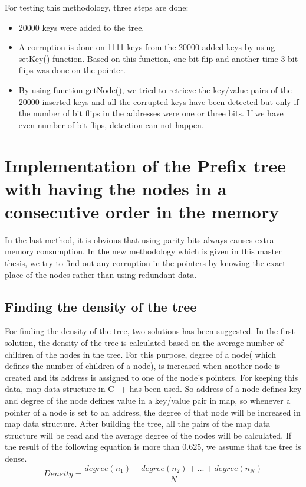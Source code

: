 \documentclass{report}
\begin{document}
For testing this methodology, three steps are done:
\begin{itemize}
\item 20000 keys were added to the tree. 
\item A corruption is done on 1111 keys from the 20000 added keys by using setKey() function. Based on this function, one bit flip and another time 3 bit flips was done on the pointer.  
\item By using function getNode(), we tried to retrieve the key/value pairs of the 20000 inserted keys and all the corrupted keys have been detected but only if the number of bit flips in the addresses were one or three bits. If we have even number of bit flips, detection can not happen.  
\end{itemize}


\section{Implementation of the Prefix tree with having the nodes in a consecutive order in the memory}   

In the last method, it is obvious that using parity bits always causes extra memory consumption. In the new methodology which is given in this master thesis, we try to find out any corruption in the pointers by knowing the exact place of the nodes rather than using redundant data. 

\subsection{Finding the density of the tree}

For finding the density of the tree, two solutions has been suggested. In the first solution, the density of the tree is calculated based on the average number of children of the nodes in the tree. For this purpose, degree of a node( which defines the number of children of a node), is increased when another node is created and its address is assigned to one of the node's pointers. For keeping this data, map data structure in C++ has been used. So address of a node defines key and degree of the node defines value in a key/value pair in map, so whenever a pointer of a node is set to an address, the degree of that node will be increased in map data structure. After building the tree, all the pairs of the map data structure will be read and the average degree of the nodes will be calculated. If the result of the following equation is more than $0.625$, we assume that the tree is dense. 
\begin{equation}
Density = \frac{degree(n_1)+degree(n_2)+...+degree(n_N)}{N}
\end{equation}   
\end{document}
